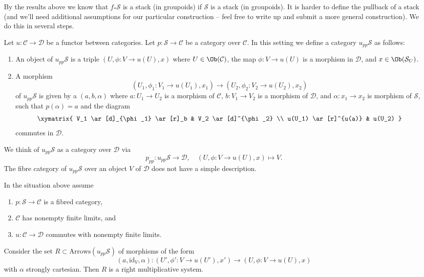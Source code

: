 \noindent
By the results above we know that $f_*\mathcal{S}$ is a stack (in groupoids)
if $\mathcal{S}$ is a stack (in groupoids).
It is harder to define the pullback of a stack (and we'll need additional
assumptions for our particular construction -- feel free to write up and
submit a more general construction). We do this in several steps.

\medskip\noindent
Let $u : \mathcal{C} \to \mathcal{D}$ be a functor between categories.
Let $p : \mathcal{S} \to \mathcal{C}$ be a category over $\mathcal{C}$.
In this setting we define a category $u_{pp}\mathcal{S}$ as follows:
\begin{enumerate}
\item An object of $u_{pp}\mathcal{S}$ is a triple
$(U, \phi : V \to u(U), x)$ where $U \in \Ob(\mathcal{C})$,
the map $\phi : V \to u(U)$ is a morphism in $\mathcal{D}$,
and $x \in \Ob(\mathcal{S}_U)$.
\item A morphism
$$
(U_1, \phi_1 : V_1 \to u(U_1), x_1)
\longrightarrow
(U_2, \phi_2 : V_2 \to u(U_2), x_2)
$$
of $u_{pp}\mathcal{S}$ is given by a
$(a, b, \alpha)$ where $a : U_1 \to U_2$ is a morphism of $\mathcal{C}$,
$b : V_1 \to V_2$ is a morphism of $\mathcal{D}$, and
$\alpha : x_1 \to x_2$ is morphism of $\mathcal{S}$,
such that $p(\alpha) = a$ and the diagram
$$
\xymatrix{
V_1 \ar[d]_{\phi_1} \ar[r]_b & V_2 \ar[d]^{\phi_2} \\
u(U_1) \ar[r]^{u(a)} & u(U_2)
}
$$
commutes in $\mathcal{D}$.
\end{enumerate}
We think of $u_{pp}\mathcal{S}$ as a category over $\mathcal{D}$ via
$$
p_{pp} : u_{pp}\mathcal{S} \longrightarrow \mathcal{D},
\quad
(U, \phi : V \to u(U), x) \longmapsto V.
$$
The fibre category of $u_{pp}\mathcal{S}$ over an object $V$ of $\mathcal{D}$
does not have a simple description.

\begin{lemma}
\label{lemma-right-multiplicative-system}
In the situation above assume
\begin{enumerate}
\item $p : \mathcal{S} \to \mathcal{C}$ is a fibred category,
\item $\mathcal{C}$ has nonempty finite limits, and
\item $u : \mathcal{C} \to \mathcal{D}$ commutes with nonempty finite limits.
\end{enumerate}
Consider the set $R \subset \text{Arrows}(u_{pp}\mathcal{S})$ of morphisms
of the form
$$
(a, \text{id}_V, \alpha) :
(U', \phi' : V \to u(U'), x')
\longrightarrow
(U, \phi : V \to u(U), x)
$$
with $\alpha$ strongly cartesian. Then $R$ is a right multiplicative system.
\end{lemma}


